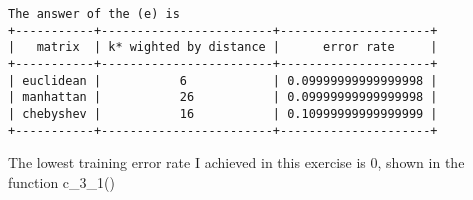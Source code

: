 \documentclass[11pt]{article}
\begin{document}
    \begin{Verbatim}[commandchars=\\\{\}]
The answer of the (e) is 
+-----------+------------------------+---------------------+
|   matrix  | k* wighted by distance |      error rate     |
+-----------+------------------------+---------------------+
| euclidean |           6            | 0.09999999999999998 |
| manhattan |           26           | 0.09999999999999998 |
| chebyshev |           16           | 0.10999999999999999 |
+-----------+------------------------+---------------------+

    \end{Verbatim}

    The lowest training error rate I achieved in this exercise is 0, shown
in the function c\_3\_1()


    
    
    
    
\end{document}
